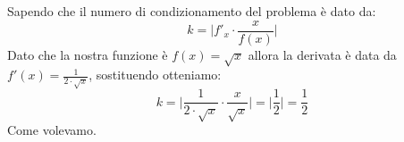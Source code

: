 Sapendo che il numero di condizionamento del problema è dato da:
\[
k =  \big| f'_{x}\cdot\frac{x}{f(x)} \big|
\]
Dato che la nostra funzione è $f(x) = \sqrt{x}$ allora la derivata è data da \newline $f'(x)=\frac{1}{2\cdot\sqrt{x}}$, sostituendo otteniamo:
\[
k = \big| \frac{1}{2\cdot\sqrt{x}}\cdot\frac{x}{\sqrt{x}} \big| = \big| \frac{1}{2} \big| = \frac{1}{2}
\]
Come volevamo.